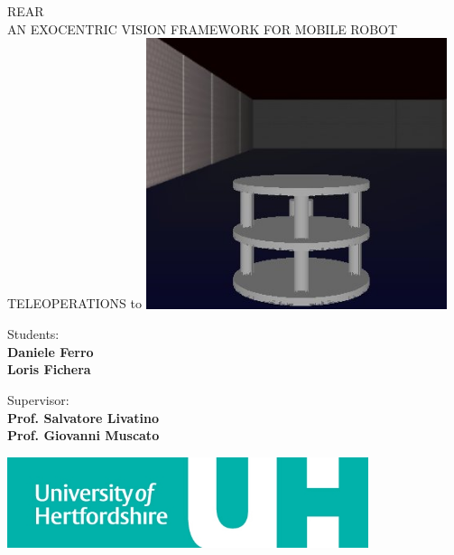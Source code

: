 \begin{titlepage}
  \begin{center}
    \uppercase{ \textsf{
        \LARGE{REAR} \\ 
        \vspace{0.5truecm}
        \large{an exocentric vision framework for mobile robot teleoperations}
    }}
    \hbox to \textwidth{\hrulefill}
    \vfill
    \includegraphics[width=250pt]{img/rear_snapshot.jpg}
    \vfill
    
    \begin{flushright}
      \textsf{Students:} \\
      \textsf{\textbf{Daniele Ferro}} \\                      
      \textsf{\textbf{Loris Fichera}}
      \vspace{0.5 truecm}
                
      \textsf{Supervisor:} \\
      \textsf{\textbf{Prof. Salvatore Livatino }}\\
      \textsf{\textbf{Prof. Giovanni Muscato }}\\
    \end{flushright}
    
    \vspace{0.5 truecm}
    \hfill \includegraphics[width=300pt]{img/uni_logo.jpg}  %
    
  \end{center}
  
\end{titlepage}

\setlength{\baselineskip}{1.3\baselineskip} %

\tableofcontents

\newpage
